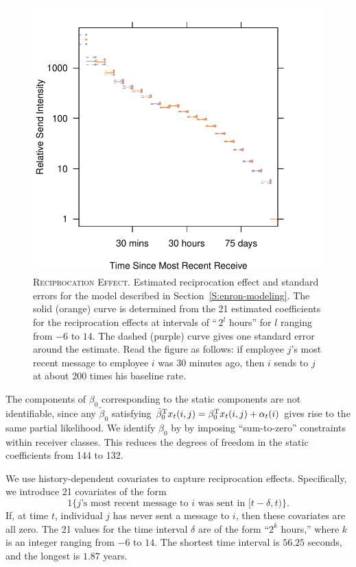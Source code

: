 \documentclass[aoas,preprint]{imsart}
\begin{document}
\begin{figure}[h]
    \includegraphics[scale=0.6]{figures/reciprocation-bc}
    \caption{
        \textsc{Reciprocation Effect.}
        Estimated reciprocation effect and standard errors for the
        model described in Section~\ref{S:enron-modeling}.  The solid
        (orange) curve is determined from the 21 estimated coefficients
        for the reciprocation effects at intervals of ``\,$2^l$ hours''
        for $l$ ranging from $-6$ to $14$.  The dashed (purple) curve gives
        one standard error around the estimate.  Read the figure as follows:
        if employee $j$'s most recent message to employee $i$ was 30 minutes
        ago, then $i$ sends to $j$ at about 200 times his baseline rate.
    }\label{F:reciprocation}
\end{figure}

The components of $\beta_0$ corresponding to the static components are not
identifiable, since any $\tilde \beta_0$ satisfying
$\tilde \beta_0^{\mathrm{T}} x_t(i,j) = \beta_0^{\mathrm{T}} x_t(i,j) + \alpha_t(i)$
gives rise to the same partial likelihood.  We identify $\beta_0$ by
by imposing ``sum-to-zero'' constraints within receiver classes.
This reduces the degrees of freedom in the static coefficients from 144 to
132.

We use history-dependent covariates to capture reciprocation effects.
Specifically, we introduce 21 covariates of the form
\[
    1\{\text{$j$'s most recent message to $i$ was sent in $[t-\delta, t)$\}}.
\]
If, at time $t$, individual $j$ has never sent a message to $i$, then
these covariates are all zero.  The 21 values for the time interval
$\delta$ are of the form ``$2^k$ hours,'' where $k$ is an integer ranging
from $-6$ to $14$.  The shortest time interval is $56.25$ seconds, and the
longest is $1.87$ years.
\end{document}
